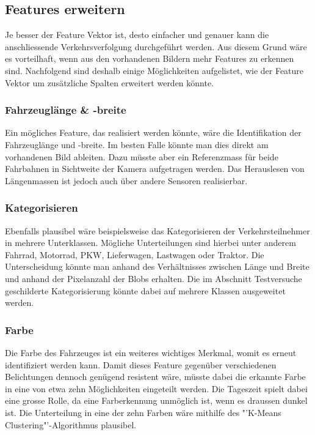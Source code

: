 \subsection{Features erweitern}
Je besser der Feature Vektor ist, desto einfacher und genauer kann die anschliessende Verkehrsverfolgung durchgeführt werden. Aus diesem Grund wäre es vorteilhaft, wenn aus den vorhandenen Bildern mehr Features zu erkennen sind. Nachfolgend sind deshalb einige Möglichkeiten aufgelistet, wie der Feature Vektor um zusätzliche Spalten erweitert werden könnte.

\subsubsection{Fahrzeuglänge \& -breite}
Ein mögliches Feature, das realisiert werden könnte, wäre die Identifikation der Fahrzeuglänge und -breite. Im besten Falle könnte man dies direkt am vorhandenen Bild ableiten. Dazu müsste aber ein Referenzmass für beide Fahrbahnen in Sichtweite der Kamera aufgetragen werden. Das Herauslesen von Längenmassen ist jedoch auch über andere Sensoren realisierbar. 

\subsubsection{Kategorisieren}
Ebenfalls plausibel wäre beispielsweise das Kategorisieren der Verkehrsteilnehmer in mehrere Unterklassen. Mögliche Unterteilungen sind hierbei unter anderem Fahrrad, Motorrad, PKW, Lieferwagen, Lastwagen oder Traktor. Die Unterscheidung könnte man anhand des Verhältnisses zwischen Länge und Breite und anhand der Pixelanzahl der Blobs erhalten. Die im Abschnitt Testversuche geschilderte Kategorisierung könnte dabei auf mehrere Klassen ausgeweitet werden.


\subsubsection{Farbe}
Die Farbe des Fahrzeuges ist ein weiteres wichtiges Merkmal, womit es erneut identifiziert werden kann. Damit dieses Feature gegenüber verschiedenen Belichtungen dennoch genügend resistent wäre, müsste dabei die erkannte Farbe in eine von etwa zehn Möglichkeiten eingeteilt werden. Die Tageszeit spielt dabei eine grosse Rolle, da eine Farberkennung unmöglich ist, wenn es draussen dunkel ist. Die Unterteilung in eine der zehn Farben wäre mithilfe des "'K-Means Clustering"'-Algorithmus plausibel.

